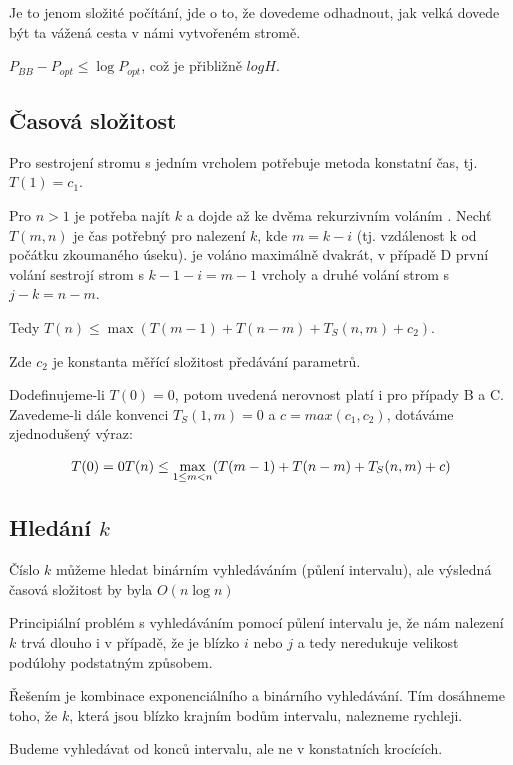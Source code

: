 Je to jenom složité počítání, jde o to, že dovedeme odhadnout, 
jak velká dovede být ta vážená cesta v námi vytvořeném stromě.

$P_{BB} - P_{opt} \leq \log P_{opt}$, což je přibližně $log H$.

\subsection{Časová složitost}

Pro sestrojení stromu s jedním vrcholem potřebuje metoda konstatní čas, tj. $T(1)=c_1$.

Pro $n > 1$ je potřeba najít $k$ a dojde až ke dvěma rekurzivním 
voláním .
Nechť $T(m,n)$ je čas potřebný pro nalezení $k$, kde $m = k - i$ 
(tj. vzdálenost k od počátku zkoumaného úseku).
 je voláno maximálně dvakrát, v případě D první 
volání sestrojí strom s $k - 1 - i = m - 1$ 
vrcholy a druhé volání strom s $j - k = n - m$.

Tedy $T(n) \leq \max(T(m-1) + T(n-m) + T_S(n,m) + c_2)$.

Zde $c_2$ je konstanta měřící složitost předávání parametrů.

Dodefinujeme-li $T(0) = 0$, potom uvedená nerovnost platí i pro případy 
B a C. Zavedeme-li dále konvenci $T_S(1,m) = 0$ a 
$c = max(c_1, c_2)$, dotáváme zjednodušený výraz:

\begin{equation} 
T(0) = 0 \\
T(n) \leq \max_{1 \leq m < n}(T(m-1) + T(n-m) + T_S(n,m) + c)
\end{equation} 


\subsection{Hledání $k$}

Číslo $k$ můžeme hledat binárním vyhledáváním (půlení intervalu), 
ale výsledná časová složitost by byla $O(n\log n)$

Principiální problém s vyhledáváním pomocí půlení intervalu je, 
že nám nalezení $k$ trvá dlouho i v případě, že je blízko
$i$ nebo $j$ a tedy neredukuje velikost podúlohy podstatným způsobem.

Řešením je kombinace exponenciálního a binárního vyhledávání. 
Tím do\-sáh\-ne\-me toho, že $k$, která jsou blízko krajním 
bodům intervalu, nalezneme rychleji.

Budeme vyhledávat od konců intervalu, ale ne v konstatních krocících.

